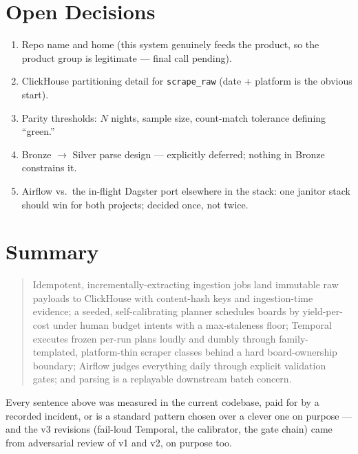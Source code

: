 \documentclass[11pt,a4paper]{article}
\begin{document}
\section{Open Decisions}
\begin{enumerate}
\item Repo name and home (this system genuinely feeds the product, so the product group is legitimate ---
final call pending).
\item ClickHouse partitioning detail for \texttt{scrape\_raw} (date + platform is the obvious start).
\item Parity thresholds: $N$ nights, sample size, count-match tolerance defining ``green.''
\item Bronze $\rightarrow$ Silver parse design --- explicitly deferred; nothing in Bronze constrains it.
\item Airflow vs.\ the in-flight Dagster port elsewhere in the stack: one janitor stack should win for
both projects; decided once, not twice.
\end{enumerate}

\section{Summary}

\begin{quote}
Idempotent, incrementally-extracting ingestion jobs land immutable raw payloads to ClickHouse with
content-hash keys and ingestion-time evidence; a seeded, self-calibrating planner schedules boards by
yield-per-cost under human budget intents with a max-staleness floor; Temporal executes frozen per-run
plans loudly and dumbly through family-templated, platform-thin scraper classes behind a hard
board-ownership boundary; Airflow judges everything daily through explicit validation gates; and parsing
is a replayable downstream batch concern.
\end{quote}

Every sentence above was measured in the current codebase, paid for by a recorded incident, or is a
standard pattern chosen over a clever one on purpose --- and the v3 revisions (fail-loud Temporal, the
calibrator, the gate chain) came from adversarial review of v1 and v2, on purpose too.
\end{document}
